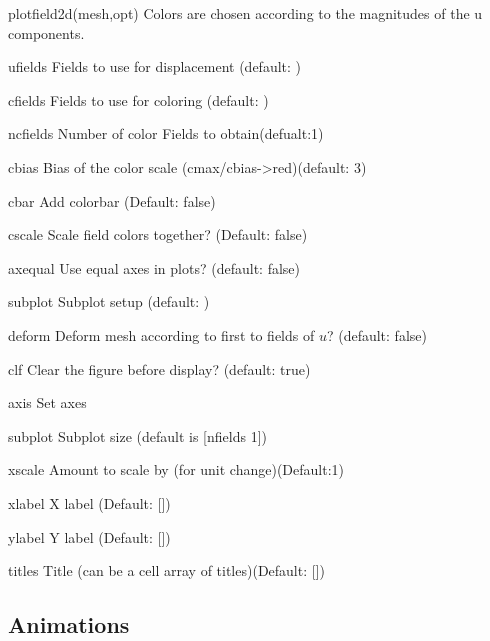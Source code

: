 \begin{codelist}
  \item[plotfield2d(mesh,opt)]
  Colors are chosen according to the magnitudes of the u components.
      \begin{codelist}
      \item[ufields]  Fields to use for displacement 
        (default: \ttt{[1,2]})
      \item[cfields]  Fields to use for coloring
        (default: \ttt{[1,2]})
      \item[ncfields] Number of color Fields to obtain(defualt:1)
      \item[cbias]    Bias of the color scale (cmax/cbias->red)(default: 3)
      \item[cbar]     Add colorbar (Default: false)
      \item[cscale]   Scale field colors together? (Default: false)
      \item[axequal]  Use equal axes in plots? (default: false)
      \item[subplot]  Subplot setup (default: )
      \item[deform]   Deform mesh according to first to fields of $u$?
        (default: false)
      \item[clf]      Clear the figure before display?
        (default: true)
      \item[axis]     Set axes
      \item[subplot]  Subplot size (default is [nfields 1])
      \item[xscale]   Amount to scale by (for unit change)(Default:1)
      \item[xlabel]   X label (Default: [])
      \item[ylabel]   Y label (Default: []) 
      \item[titles]   Title (can be a cell array of titles)(Default: []) 
      \end{codelist}

\end{codelist}

\subsection{Animations}

